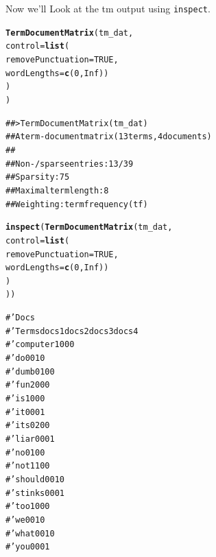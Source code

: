 \documentclass{article}\usepackage[]{graphicx}\usepackage[]{color}
\makeatletter
\newcommand{\hlkwd}[1]{\textcolor[rgb]{0.737,0.353,0.396}{\textbf{#1}}}%
\newenvironment{kframe}{%
 \def\at@end@of@kframe{}%
 \ifinner\ifhmode%
  \def\at@end@of@kframe{\end{minipage}}%
  \begin{minipage}{\columnwidth}%
 \fi\fi%
 \def\FrameCommand##1{\hskip\@totalleftmargin \hskip-\fboxsep
 \colorbox{shadecolor}{##1}\hskip-\fboxsep
     \hskip-\linewidth \hskip-\@totalleftmargin \hskip\columnwidth}%
 \MakeFramed {\advance\hsize-\width
   \@totalleftmargin\z@ \linewidth\hsize
   \@setminipage}}%
 {\par\unskip\endMakeFramed%
 \at@end@of@kframe}
\newenvironment{knitrout}{}{} %
\makeatother
\begin{document}
Now we'll Look at the tm output using \texttt{inspect}.

\begin{knitrout}
\color{fgcolor}\begin{kframe}
\begin{alltt}
\hlkwd{TermDocumentMatrix}(tm_dat, 
    control = \hlkwd{list}(
        removePunctuation = TRUE, 
        wordLengths=\hlkwd{c}(0, Inf))
    )
)
\end{alltt}
\end{kframe}
\end{knitrout}


\begin{knitrout}
\color{fgcolor}\begin{kframe}
\begin{alltt}
## > TermDocumentMatrix(tm_dat)
## A term-document matrix (13 terms, 4 documents)
## 
## Non-/sparse entries: 13/39
## Sparsity           : 75%
## Maximal term length: 8 
## Weighting          : term frequency (tf)
\end{alltt}
\end{kframe}
\end{knitrout}


\begin{knitrout}
\color{fgcolor}\begin{kframe}
\begin{alltt}
\hlkwd{inspect}(\hlkwd{TermDocumentMatrix}(tm_dat, 
    control = \hlkwd{list}(
        removePunctuation = TRUE, 
        wordLengths=\hlkwd{c}(0, Inf))
    )
))
\end{alltt}
\end{kframe}
\end{knitrout}


\begin{knitrout}
\color{fgcolor}\begin{kframe}
\begin{alltt}
#'           Docs
#' Terms      docs 1 docs 2 docs 3 docs 4
#'   computer      1      0      0      0
#'   do            0      0      1      0
#'   dumb          0      1      0      0
#'   fun           2      0      0      0
#'   is            1      0      0      0
#'   it            0      0      0      1
#'   its           0      2      0      0
#'   liar          0      0      0      1
#'   no            0      1      0      0
#'   not           1      1      0      0
#'   should        0      0      1      0
#'   stinks        0      0      0      1
#'   too           1      0      0      0
#'   we            0      0      1      0
#'   what          0      0      1      0
#'   you           0      0      0      1
\end{alltt}
\end{kframe}
\end{knitrout}
\end{document}
